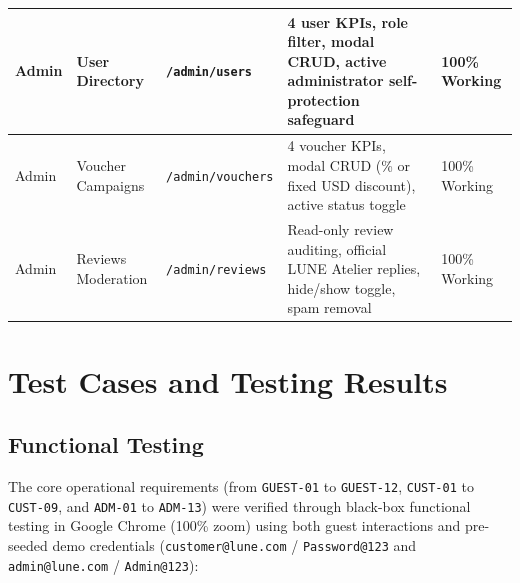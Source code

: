 \documentclass[12pt,a4paper,oneside]{report}
\begin{document}
\begin{longtable}{|p{1.9cm}|p{3.3cm}|p{2.5cm}|p{5.5cm}|p{1.6cm}|}
\hline
Admin & User Directory & \texttt{/admin/users} & 4 user KPIs, role filter, modal CRUD, active administrator self-protection safeguard & 100\% Working \\
\hline
Admin & Voucher Campaigns & \texttt{/admin/vouchers} & 4 voucher KPIs, modal CRUD (\% or fixed USD discount), active status toggle & 100\% Working \\
\hline
Admin & Reviews Moderation & \texttt{/admin/reviews} & Read-only review auditing, official LUNE Atelier replies, hide/show toggle, spam removal & 100\% Working \\
\hline
\end{longtable}

\section{Test Cases and Testing Results}

\subsection{Functional Testing}
The core operational requirements (from \texttt{GUEST-01} to \texttt{GUEST-12}, \texttt{CUST-01} to \texttt{CUST-09}, and \texttt{ADM-01} to \texttt{ADM-13}) were verified through black-box functional testing in Google Chrome (100\% zoom) using both guest interactions and pre-seeded demo credentials (\texttt{customer@lune.com} / \texttt{Password@123} and \texttt{admin@lune.com} / \texttt{Admin@123}):
\end{document}

